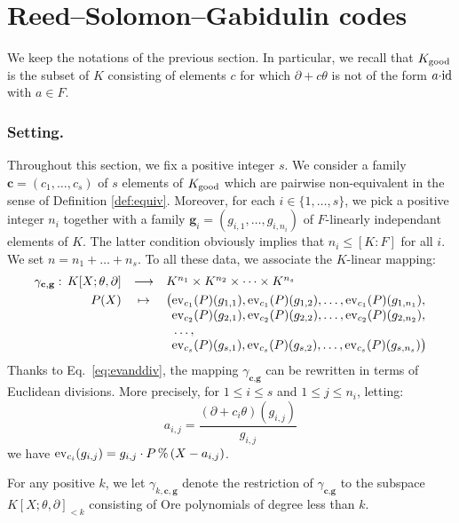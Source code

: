\documentclass[a4paper]{llncs}
\newcommand{\id}{\textrm{\rm id}}
\newcommand{\ev}[1]{\textrm{\rm ev}_{#1}}
\renewcommand{\mod}{\,\%\,}
\newcommand{\bc}{\textbf{c}}
\newcommand{\bg}{\textbf{g}}
\newcommand{\good}{\textrm{\rm good}}
\begin{document}
\section{Reed--Solomon--Gabidulin codes}

We keep the notations of the previous section. In particular, we recall 
that $K_\good$ is the subset of $K$ consisting of elements $c$ for which 
$\partial + c\theta$ is not of the form $a{\cdot}\id$ with $a \in F$.

\subsubsection*{Setting.}

Throughout this section, we fix a positive integer $s$. We consider a 
family $\bc = (c_1, \ldots, c_s)$ of $s$ elements of $K_\good$ which are 
pairwise non-equivalent in the sense of Definition \ref{def:equiv}.
Moreover, for each $i \in \{1,\ldots,s\}$, we pick a positive integer
$n_i$ together with a family $\bg_i = (g_{i,1}, \ldots, g_{i,n_i})$ of 
$F$-linearly independant elements of $K$. The latter condition obviously
implies that $n_i \leq [K:F]$ for all $i$.
We set $n = n_1 + \ldots + n_s$.
To all these data, we associate the $K$-linear mapping:
$$\begin{array}{rcl}
\gamma_{\bc,\bg} : \, K[X;\theta,\partial] & \longrightarrow 
 & K^{n_1} \times K^{n_2} \times \cdots \times K^{n_s} \smallskip \\
P(X) & \mapsto 
 & \big(\ev{c_1}(P)(g_{1,1}), \ev{c_1}(P)(g_{1,2}), \ldots, \ev{c_1}(P)(g_{1,n_1}), \\
&& \phantom{\big(}\ev{c_2}(P)(g_{2,1}), \ev{c_2}(P)(g_{2,2}), \ldots, \ev{c_2}(P)(g_{2,n_2}), \\
&& \phantom{\big(}\ldots, \\
&& \phantom{\big(}\ev{c_s}(P)(g_{s,1}), \ev{c_s}(P)(g_{s,2}), \ldots, \ev{c_s}(P)(g_{s,n_s})\big)
\end{array}$$
Thanks to Eq.~\eqref{eq:evanddiv}, the mapping $\gamma_{\bc,\bg}$
can be rewritten in terms of Euclidean divisions. More precisely,
for $1 \leq i \leq s$ and $1 \leq j \leq n_i$, letting:
\begin{equation}
\label{eq:aij}
a_{i,j} = \frac{(\partial + c_i\theta)(g_{i,j})}{g_{i,j}}
\end{equation}
we have $\ev{c_i}(g_{i,j}) = g_{i,j} \cdot P \mod (X - a_{i,j})$.

For any positive $k$, we let $\gamma_{k,\bc,\bg}$ denote the 
restriction of $\gamma_{\bc,\bg}$ to the subspace 
$K[X;\theta,\partial]_{<k}$ consisting of Ore polynomials of
degree less than $k$.
\end{document}
